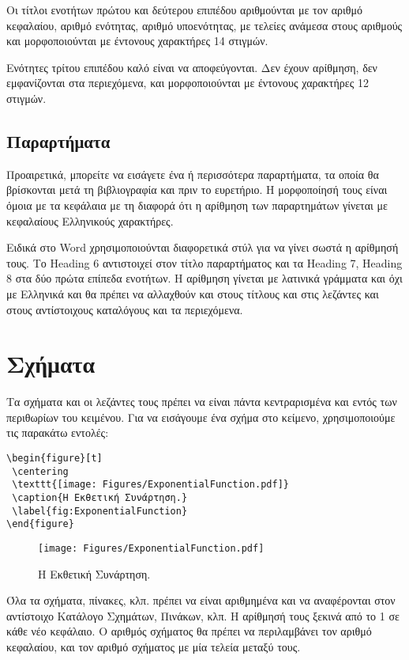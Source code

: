 Οι τίτλοι ενοτήτων πρώτου και δεύτερου επιπέδου αριθμούνται με τον αριθμό κεφαλαίου, αριθμό ενότητας, αριθμό υποενότητας, με τελείες ανάμεσα στους αριθμούς και μορφοποιούνται με έντονους χαρακτήρες 14 στιγμών.

Ενότητες τρίτου επιπέδου καλό είναι να αποφεύγονται.
Δεν έχουν αρίθμηση, δεν εμφανίζονται στα περιεχόμενα, και μορφοποιούνται με έντονους χαρακτήρες 12 στιγμών.


\subsection{Παραρτήματα}
\label{subsec:Appendices}
Προαιρετικά, μπορείτε να εισάγετε ένα ή περισσότερα παραρτήματα, τα οποία 
θα βρίσκονται μετά τη βιβλιογραφία και πριν το ευρετήριο.
Η μορφοποίησή τους είναι όμοια με τα κεφάλαια με τη διαφορά ότι η αρίθμηση των παραρτημάτων 
γίνεται με κεφαλαίους Ελληνικούς χαρακτήρες.

Ειδικά στο Word χρησιμοποιούνται διαφορετικά στύλ για να γίνει σωστά η αρίθμησή τους.
Το Heading 6 αντιστοιχεί στον τίτλο παραρτήματος και τα Heading 7, Heading 8 στα δύο πρώτα επίπεδα ενοτήτων. 
H αρίθμηση γίνεται με λατινικά γράμματα και όχι με Ελληνικά και θα πρέπει να αλλαχθούν και στους τίτλους και στις λεζάντες και στους αντίστοιχους καταλόγους και τα περιεχόμενα.

\section{Σχήματα}
\label{sec:Figures}
Τα σχήματα και οι λεζάντες τους πρέπει να είναι πάντα κεντραρισμένα και εντός 
των περιθωρίων του κειμένου. Για να εισάγουμε ένα σχήμα στο κείμενο, 
χρησιμοποιούμε τις παρακάτω εντολές:

\begin{verbatim}
\begin{figure}[t]
 \centering
 \texttt{[image: Figures/ExponentialFunction.pdf]}
 \caption{Η Εκθετική Συνάρτηση.}
 \label{fig:ExponentialFunction}
\end{figure}
\end{verbatim}

\begin{figure}[t]
	\centering
	\texttt{[image: Figures/ExponentialFunction.pdf]}
	\caption{Η Εκθετική Συνάρτηση.}
	\label{fig:ExponentialFunction}
\end{figure}

Όλα τα σχήματα, πίνακες, κλπ. πρέπει να είναι αριθμημένα και να αναφέρονται στον αντίστοιχο Κατάλογο Σχημάτων, Πινάκων, κλπ.
Η αρίθμησή τους ξεκινά από το 1 σε κάθε νέο κεφάλαιο.
Ο αριθμός σχήματος θα πρέπει να περιλαμβάνει τον αριθμό κεφαλαίου, και τον αριθμό σχήματος με μία τελεία μεταξύ τους.

